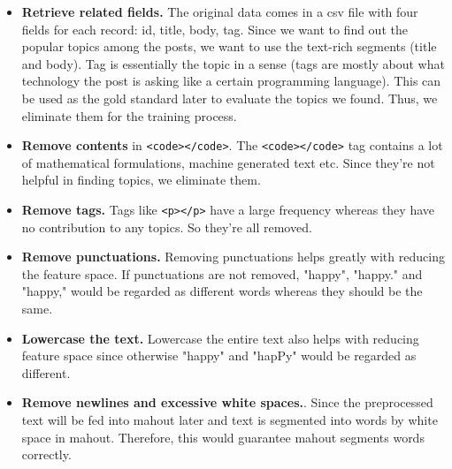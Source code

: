 \documentclass[conference]{IEEEtran}
\begin{document}
\begin{itemize}
	\item \textbf{Retrieve related fields.} The original data comes in a csv file with four fields for each record: id, title, body, tag. Since we want to find out the popular topics among the posts, we want to use the text-rich segments (title and body). Tag is essentially the topic in a sense (tags are mostly about what technology the post is asking like a certain programming language). This can be used as the gold standard later to evaluate the topics we found. Thus, we eliminate them for the training process. 
	\item \textbf{Remove contents} in \verb+<code></code>+. The \verb+<code></code>+ tag contains a lot of mathematical formulations, machine generated text etc. Since they're not helpful in finding topics, we eliminate them.
	\item \textbf{Remove tags.} Tags like \verb+<p></p>+ have a large frequency whereas they have no contribution to any topics. So they're all removed.
	\item \textbf{Remove punctuations.} Removing punctuations helps greatly with reducing the feature space. If punctuations are not removed, "happy", "happy." and "happy," would be regarded as different words whereas they should be the same.
	\item \textbf{Lowercase the text.} Lowercase the entire text also helps with reducing feature space since otherwise "happy" and "hapPy" would be regarded as different.
	\item \textbf{Remove newlines and excessive white spaces.}. Since the preprocessed text will be fed into mahout later and text is segmented into words by white space in mahout. Therefore, this would guarantee mahout segments words correctly.
\end{itemize}
\end{document}
